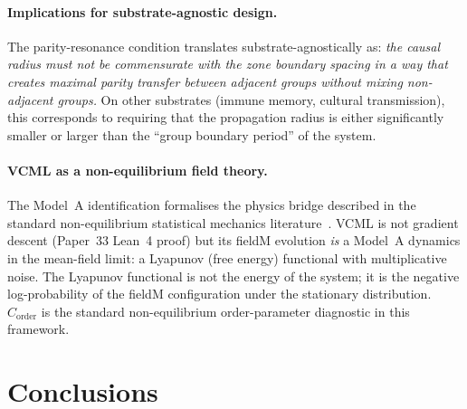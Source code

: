 \documentclass[11pt,a4paper]{article}
\newcommand{\Corder}{C_{\mathrm{order}}}
\begin{document}
\paragraph{Implications for substrate-agnostic design.}
The parity-resonance condition translates substrate-agnostically as:
\emph{the causal radius must not be commensurate with the zone boundary spacing in a way
that creates maximal parity transfer between adjacent groups without mixing
non-adjacent groups.}
On other substrates (immune memory, cultural transmission), this corresponds to
requiring that the propagation radius is either significantly smaller or larger
than the ``group boundary period'' of the system.

\paragraph{VCML as a non-equilibrium field theory.}
The Model~A identification formalises the physics bridge described in the standard
non-equilibrium statistical mechanics literature~\cite{hohenberg1977}.
VCML is not gradient descent (Paper~33 Lean~4 proof) but its fieldM evolution
\emph{is} a Model~A dynamics in the mean-field limit:
a Lyapunov (free energy) functional with multiplicative noise.
The Lyapunov functional is not the energy of the system; it is the negative
log-probability of the fieldM configuration under the stationary distribution.
$\Corder$ is the standard non-equilibrium order-parameter diagnostic in this framework.

\section{Conclusions}
\end{document}
